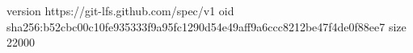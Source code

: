 version https://git-lfs.github.com/spec/v1
oid sha256:b52cbc00c10fe935333f9a95fc1290d54e49aff9a6ccc8212be47f4de0f88ee7
size 22000
